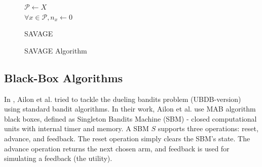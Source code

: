 \documentclass[MSc,beforeExam]{iitcsthesis}
\begin{document}
\begin{figure}[h]
	\IncMargin{1em}
		\begin{algorithm}[H]
		
			$ \mathcal{P} \leftarrow X $\\
			$ \forall x \in \mathcal{P}, n_x \leftarrow 0 $\\
		\BlankLine
			\caption{SAVAGE}
		\end{algorithm}
		\caption{SAVAGE Algorithm}\label{algo_SAVAGE}
	\end{figure}
	\newpage
	
\subsection{Black-Box Algorithms}
	In \cite{ailon2014reducing}, Ailon et al. tried to tackle the dueling bandits problem (UBDB-version) using standard bandit algorithms.
	In their work, Ailon et al. use MAB algorithm black boxes, defined as Singleton Bandits Machine (SBM) - closed computational units with internal timer and memory.
	A SBM $S$ supports three operations: reset, advance, and feedback. The reset operation simply clears the SBM's state.
	The advance operation returns the next chosen arm, and feedback is used for simulating a feedback (the utility).
\end{document}
